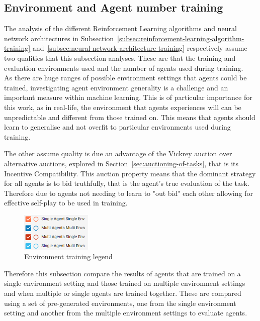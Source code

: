\subsection{Environment and Agent number training}\label{subsec:environment-and-agent-number-training}
The analysis of the different Reinforcement Learning algorithms and neural network architectures in
Subsection~\ref{subsec:reinforcement-learning-algorithm-training} and~\ref{subsec:neural-network-architecture-training}
respectively assume two qualities that this subsection analyses. These are that the training and evaluation environments
used and the number of agents used during training. \\
As there are huge ranges of possible environment settings that agents could be trained, investigating agent environment
generality is a challenge and an important measure within machine learning. This is of particular importance for this
work, as in real-life, the environment that agents experiences will can be unpredictable and different from those
trained on. This means that agents should learn to generalise and not overfit to particular environments used during
training.

The other assume quality is due an advantage of the Vickrey auction over alternative auctions, explored in
Section~\ref{sec:auctioning-of-tasks}, that is its Incentive Compatibility. This auction property means that the
dominant strategy for all agents is to bid truthfully, that is the agent's true evaluation of the task. Therefore due
to agents not needing to learn to "out bid" each other allowing for effective self-play to be used in training.

\begin{figure}
    \includegraphics[width=0.3\textwidth]{figures/5_evaluation_figs/env_training_fig/legend.png}
    \caption{Environment training legend}
    \label{fig:env-training-legend}
\end{figure}

Therefore this subsection compare the results of agents that are trained on a single environment setting and those
trained on multiple environment settings and when multiple or single agents are trained together. These are compared
using a set of pre-generated environments, one from the single environment setting and another from the multiple
environment settings to evaluate agents.

